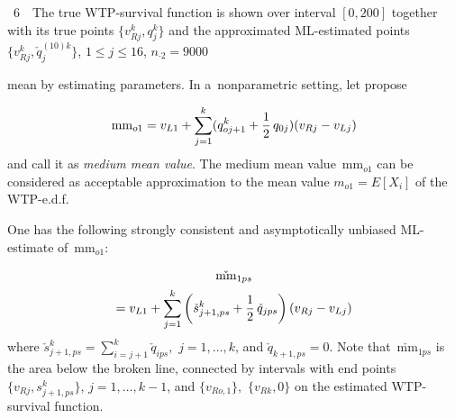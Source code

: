 \begin{multicols}{2}

\noindent
{{\figurename~6}\ \ \small{The true WTP-survival function is
shown over interval $[ 0, 200]$  together with its true points
  $\{ v_{Rj}^k, q_{j}^k \}$ and the approximated ML-estimated
  points  $\{ v_{Rj}^k,\check q_j^{(10)k}  \}$, 
  $1\le j\le 16$, $n_{\cdot 2}= 9000$}}

\vspace*{14pt}

\addtocounter{figure}{1}
 

\noindent
 mean by estimating parameters.
In a~nonparametric setting, let propose

\noindent
$$
\mathrm{mm}_{o1} =v_{L1} +\sum\limits_{j=1}^k (q_{o j+1}^k +\displaystyle\frac{\displaystyle 1\mathstrut}{\displaystyle 2\mathstrut}\,q_{0j}) (v_{Rj}-v_{Lj})
$$
 and call it as \textit{medium mean value}.
  The medium mean value~mm$_{o1}$ can be considered as acceptable approximation to the mean value
  $m_{o1} =E [X_i]$ of the WTP-e.d.f.

One has the following strongly consistent and asymptotically unbiased ML-estimate of~mm$_{o1}$:

\vspace*{-6pt}

\noindent
  \begin{multline}
  \label{FR-57a}
\check{\mathrm{mm}}_{1 ps}\\ = v_{L1} 
+ \sum\limits_{j=1}^k \left(\check s_{j+1, ps}^k
 +\displaystyle\frac{\displaystyle 1\mathstrut}{\displaystyle 2\mathstrut}\,\check q_{j ps} \right ) \left(v_{Rj}-v_{Lj}\right)
\end{multline}
where $\check s_{j+1, ps}^k=\sum_{i=j+1}^k \check q_{i ps},$ $ j=1, \ldots, k$, and
$\check q_{k+1, ps}=0$.
 Note that~$\check{\mathrm{mm}}_{1 ps} $ is the area below the
 broken line, connected by intervals with end points $\{ v_{R j}, s_{j+1, ps}^k \}$, 
 $j=1, \ldots, k-1$,
 and $\{ v_{Ro, 1} \} ,$ $\{ v_{Rk}, 0\}$ on the estimated  WTP-survival function.

\begin{figure*} %
       \vspace*{1pt}
 \begin{center}
 \mbox{%
 \epsfxsize=164.073mm
 }
 \end{center}
 \vspace*{-9pt}
   \label{FG-N07}
\end{figure*}


\end{multicols}
